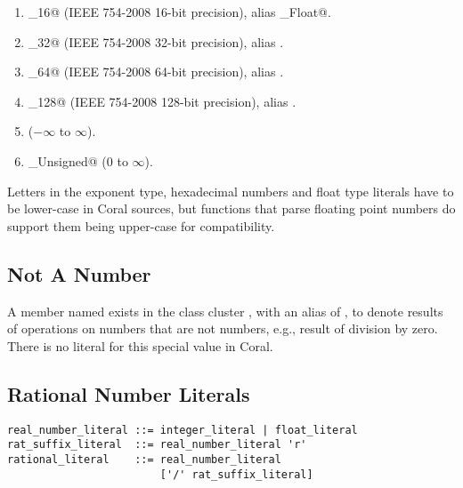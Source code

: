 \begin{enumerate}

  \item \lstinline@Float_16@ (IEEE 754-2008 16-bit precision), alias \lstinline@Half_Float@. 
  
  \item \lstinline@Float_32@ (IEEE 754-2008 32-bit precision), alias \lstinline@Float@. 

  \item \lstinline@Float_64@ (IEEE 754-2008 64-bit precision), alias \lstinline@Double@.

  \item \lstinline@Float_128@ (IEEE 754-2008 128-bit precision), alias \lstinline@Quadruple@.

  \item \lstinline@Decimal@ ($-\infty$ to $\infty$).

  \item \lstinline@Decimal_Unsigned@ ($0$ to $\infty$).

\end{enumerate}

Letters in the exponent type, hexadecimal numbers and float type literals have to be lower-case in Coral sources, but functions that parse floating point numbers do support them being upper-case for compatibility. 





\subsection{Not A Number}
\label{sec:nan}

A member named  exists in the class cluster , with an alias of , to denote results of operations on numbers that are not numbers, e.g., result of division by zero. There is no literal for this special value in Coral. 





\subsection{Rational Number Literals}
\label{sec:rationalliterals}

\syntax\begin{lstlisting}
real_number_literal ::= integer_literal | float_literal
rat_suffix_literal  ::= real_number_literal 'r'
rational_literal    ::= real_number_literal 
                        ['/' rat_suffix_literal]
\end{lstlisting}

